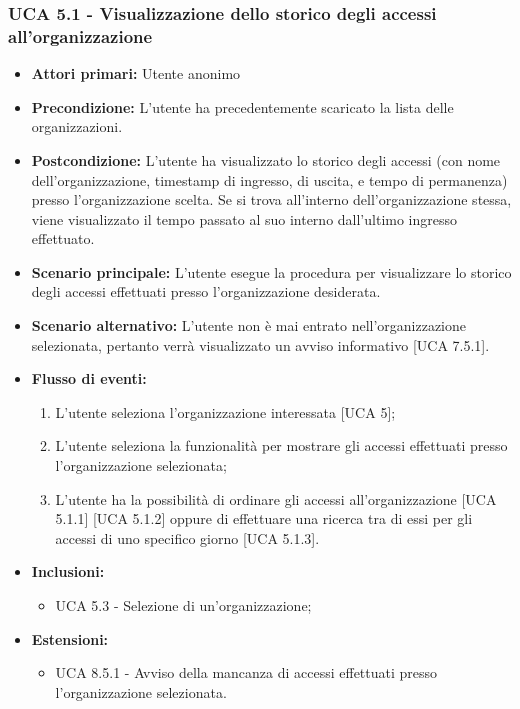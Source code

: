 \subsubsection{UCA 5.1 - Visualizzazione dello storico degli accessi all'organizzazione}
\begin{itemize}
    \item \textbf{Attori primari:} Utente anonimo
    \item \textbf{Precondizione:} L'utente ha precedentemente scaricato la lista delle organizzazioni.
    \item \textbf{Postcondizione:} L'utente ha visualizzato lo storico degli accessi (con nome dell'organizzazione, timestamp di ingresso, di uscita, e tempo di permanenza) presso l'organizzazione scelta. Se si trova all'interno dell'organizzazione stessa, viene visualizzato il tempo passato al suo interno dall'ultimo ingresso effettuato.
    \item \textbf{Scenario principale:} L'utente esegue la procedura per visualizzare lo storico degli accessi effettuati presso l'organizzazione desiderata.
    \item \textbf{Scenario alternativo:} L'utente non è mai entrato nell'organizzazione selezionata, pertanto verrà visualizzato un avviso informativo [UCA 7.5.1].
    \item \textbf{Flusso di eventi:}
    \begin{enumerate}
        \item L'utente seleziona l'organizzazione interessata [UCA 5];
        \item L'utente seleziona la funzionalità per mostrare gli accessi effettuati presso l'organizzazione selezionata;
        \item L'utente ha la possibilità di ordinare gli accessi all'organizzazione [UCA 5.1.1] [UCA 5.1.2] oppure di effettuare una ricerca tra di essi per gli accessi di uno specifico giorno [UCA 5.1.3].
    \end{enumerate}
    \item \textbf{Inclusioni:}
    \begin{itemize}
        \item UCA 5.3 - Selezione di un'organizzazione;
    \end{itemize}
    \item \textbf{Estensioni:}
    \begin{itemize}
        \item UCA 8.5.1 - Avviso della mancanza di accessi effettuati presso l'organizzazione selezionata.
    \end{itemize}
\end{itemize}

